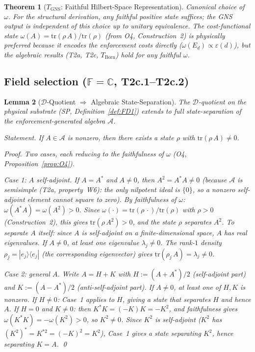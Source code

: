 \documentclass[11pt,a4paper]{article}
\newtheorem{theorem}{Theorem}[section]
\newtheorem{lemma}[theorem]{Lemma}
\theoremstyle{definition}
\newcommand{\eps}{\varepsilon}
\newcommand{\tr}{\mathrm{tr}}
\begin{document}
\begin{theorem}[$T_{\mathrm{GNS}}$: Faithful Hilbert-Space Representation]
\smallskip\noindent\textit{Canonical choice of $\omega$.}  For the structural derivation, any faithful positive state suffices; the GNS output is independent of this choice up to unitary equivalence.  The cost-functional state $\omega(A) = \tr(\rho\,A)/\tr(\rho)$ (from O4, Construction~2) is physically preferred because it encodes the enforcement costs directly ($\omega(E_d) \propto \eps(d)$), but the algebraic results (T2a, T2c, $T_{\mathrm{Born}}$) hold for any faithful $\omega$.
\end{theorem}

\subsection{Field selection ($\mathbb{F} = \mathbb{C}$, T2c.1--T2c.2)}

\begin{lemma}[$\mathcal{D}$-Quotient $\Rightarrow$ Algebraic State-Separation]\label{lem:state_sep}
The $\mathcal{D}$-quotient on the physical substrate (SP, Definition~\ref{def:FD1}) extends to full state-separation of the enforcement-generated algebra $\mathcal{A}$.

\smallskip\noindent\textit{Statement.}  If $A \in \mathcal{A}$ is nonzero, then there exists a state $\rho$ with $\tr(\rho\,A) \ne 0$.

\smallskip\noindent\textit{Proof.}  Two cases, each reducing to the faithfulness of $\omega$ (O4, Proposition~\ref{prop:O4}).

\smallskip\noindent\textit{Case 1: $A$ self-adjoint.}  If $A = A^*$ and $A \ne 0$, then $A^2 = A^*A \ne 0$ (because $\mathcal{A}$ is semisimple (T2a, property~W6): the only nilpotent ideal is $\{0\}$, so a nonzero self-adjoint element cannot square to zero).  By faithfulness of $\omega$: $\omega(A^*A) = \omega(A^2) > 0$.  Since $\omega(\cdot) = \tr(\rho\,\cdot)/\tr(\rho)$ with $\rho > 0$ (Construction~2), this gives $\tr(\rho\,A^2) > 0$, and the state $\rho$ separates $A^2$.  To separate $A$ itself: since $A$ is self-adjoint on a finite-dimensional space, $A$ has real eigenvalues.  If $A \ne 0$, at least one eigenvalue $\lambda_j \ne 0$.  The rank-$1$ density $\rho_j = |e_j\rangle\langle e_j|$ (the corresponding eigenvector) gives $\tr(\rho_j\,A) = \lambda_j \ne 0$.

\smallskip\noindent\textit{Case 2: general $A$.}  Write $A = H + K$ with $H := (A + A^*)/2$ (self-adjoint part) and $K := (A - A^*)/2$ (anti-self-adjoint part).  If $A \ne 0$, at least one of $H, K$ is nonzero.  If $H \ne 0$: Case~1 applies to $H$, giving a state that separates $H$ and hence $A$.  If $H = 0$ and $K \ne 0$: then $K^*K = (-K)K = -K^2$, and faithfulness gives $\omega(K^*K) = -\omega(K^2) > 0$, so $K^2 \ne 0$.  Since $K^2$ is self-adjoint ($K^2$ has $(K^2)^* = K^{*2} = (-K)^2 = K^2$), Case~1 gives a state separating $K^2$, hence separating $K = A$.  \qed


\end{lemma}
\end{document}
